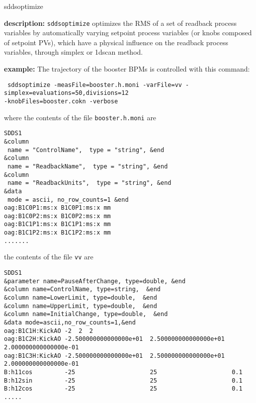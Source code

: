 %
%
\begin{sddsprog}{sddsoptimize}
\item {\bf description:}
%
%
\verb+sddsoptimize+ optimizes the RMS of a set of readback process variables by automatically varying setpoint process variables (or knobs composed of setpoint PVs), which have a physical influence on the readback process variables, through simplex or 1dscan method.   

\item {\bf example:} 
%
% 
%
The trajectory of the booster BPMs is controlled with this command:
\begin{flushleft}{\tt
sddsoptimize -measFile=booster.h.moni -varFile=vv -simplex=evaluations=50,divisions=12\\
\quad -knobFiles=booster.cokn -verbose
}\end{flushleft}
where the contents of the file \verb+booster.h.moni+ are
\begin{verbatim}
SDDS1
&column
 name = "ControlName",  type = "string", &end
&column
 name = "ReadbackName",  type = "string", &end
&column             
 name = "ReadbackUnits",  type = "string", &end
&data
 mode = ascii, no_row_counts=1 &end
oag:B1C0P1:ms:x B1C0P1:ms:x mm
oag:B1C0P2:ms:x B1C0P2:ms:x mm
oag:B1C1P1:ms:x B1C1P1:ms:x mm
oag:B1C1P2:ms:x B1C1P2:ms:x mm
.......

\end{verbatim}
the contents of the file \verb+vv+ are
\begin{verbatim}
SDDS1
&parameter name=PauseAfterChange, type=double, &end
&column name=ControlName, type=string,  &end
&column name=LowerLimit, type=double,  &end
&column name=UpperLimit, type=double,  &end
&column name=InitialChange, type=double,  &end
&data mode=ascii,no_row_counts=1,&end
oag:B1C1H:KickAO -2  2  2 
oag:B1C2H:KickAO -2.500000000000000e+01  2.500000000000000e+01  2.000000000000000e-01 
oag:B1C3H:KickAO -2.500000000000000e+01  2.500000000000000e+01  2.000000000000000e-01 
B:h11cos         -25                     25                     0.1
B:h12sin         -25                     25                     0.1
B:h12cos         -25                     25                     0.1
.....


\end{verbatim}
\end{sddsprog}
